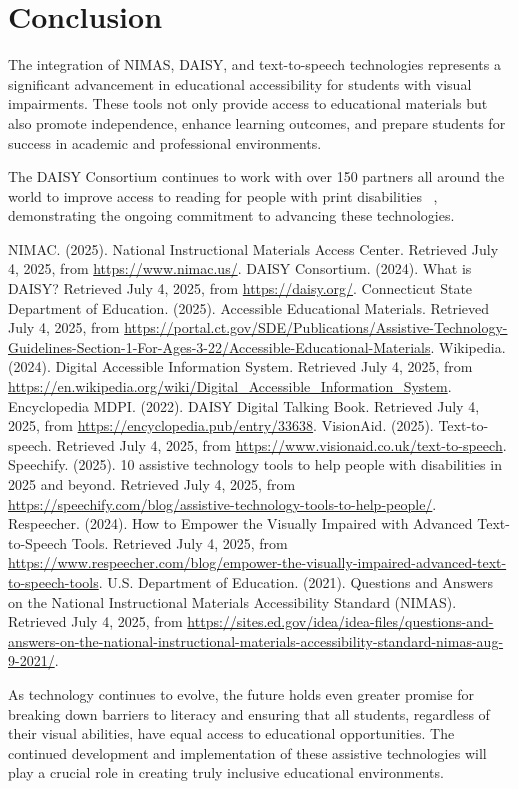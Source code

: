 \section{Conclusion}\label{conclusion}

The integration of NIMAS, DAISY, and text-to-speech technologies represents a significant advancement in educational accessibility for students with visual impairments. These tools not only provide access to educational materials but also promote independence, enhance learning outcomes, and prepare students for success in academic and professional environments.

The DAISY Consortium continues to work with over 150 partners all around the world to improve access to reading for people with print disabilities~ \cite{DAISY2024}, demonstrating the ongoing commitment to advancing these technologies.

\begin{thebibliography}{99}
 NIMAC. (2025). National Instructional Materials Access Center. Retrieved July 4, 2025, from \url{https://www.nimac.us/}.
 DAISY Consortium. (2024). What is DAISY? Retrieved July 4, 2025, from \url{https://daisy.org/}.
 Connecticut State Department of Education. (2025). Accessible Educational Materials. Retrieved July 4, 2025, from \url{https://portal.ct.gov/SDE/Publications/Assistive-Technology-Guidelines-Section-1-For-Ages-3-22/Accessible-Educational-Materials}.
 Wikipedia. (2024). Digital Accessible Information System. Retrieved July 4, 2025, from \url{https://en.wikipedia.org/wiki/Digital_Accessible_Information_System}.
 Encyclopedia MDPI. (2022). DAISY Digital Talking Book. Retrieved July 4, 2025, from \url{https://encyclopedia.pub/entry/33638}.
 VisionAid. (2025). Text-to-speech. Retrieved July 4, 2025, from \url{https://www.visionaid.co.uk/text-to-speech}.
 Speechify. (2025). 10 assistive technology tools to help people with disabilities in 2025 and beyond. Retrieved July 4, 2025, from \url{https://speechify.com/blog/assistive-technology-tools-to-help-people/}.
 Respeecher. (2024). How to Empower the Visually Impaired with Advanced Text-to-Speech Tools. Retrieved July 4, 2025, from \url{https://www.respeecher.com/blog/empower-the-visually-impaired-advanced-text-to-speech-tools}.
 U.S. Department of Education. (2021). Questions and Answers on the National Instructional Materials Accessibility Standard (NIMAS). Retrieved July 4, 2025, from \url{https://sites.ed.gov/idea/idea-files/questions-and-answers-on-the-national-instructional-materials-accessibility-standard-nimas-aug-9-2021/}.
\end{thebibliography}

As technology continues to evolve, the future holds even greater promise for breaking down barriers to literacy and ensuring that all students, regardless of their visual abilities, have equal access to educational opportunities. The continued development and implementation of these assistive technologies will play a crucial role in creating truly inclusive educational environments.
